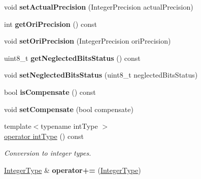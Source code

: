 \begin{DoxyCompactItemize}
void {\bfseries set\+Actual\+Precision} (Integer\+Precision actual\+Precision)
\item 
\hypertarget{classfap_1_1IntegerType_a84cae1be58ac753fe7b3ec7ab1057787}{}\label{classfap_1_1IntegerType_a84cae1be58ac753fe7b3ec7ab1057787} 
int {\bfseries get\+Ori\+Precision} () const
\item 
\hypertarget{classfap_1_1IntegerType_af24e56344bd02988028519d49bc3988a}{}\label{classfap_1_1IntegerType_af24e56344bd02988028519d49bc3988a} 
void {\bfseries set\+Ori\+Precision} (Integer\+Precision ori\+Precision)
\item 
\hypertarget{classfap_1_1IntegerType_ac63aa7c1e115d7a95299f5ff2ca07fda}{}\label{classfap_1_1IntegerType_ac63aa7c1e115d7a95299f5ff2ca07fda} 
uint8\+\_\+t {\bfseries get\+Neglected\+Bits\+Status} () const
\item 
\hypertarget{classfap_1_1IntegerType_a5754ff7a541bc36f8ca38244d701b3a0}{}\label{classfap_1_1IntegerType_a5754ff7a541bc36f8ca38244d701b3a0} 
void {\bfseries set\+Neglected\+Bits\+Status} (uint8\+\_\+t neglected\+Bits\+Status)
\item 
\hypertarget{classfap_1_1IntegerType_a55a1e4f164760d48eb8ec2aad94952b3}{}\label{classfap_1_1IntegerType_a55a1e4f164760d48eb8ec2aad94952b3} 
bool {\bfseries is\+Compensate} () const
\item 
\hypertarget{classfap_1_1IntegerType_aeffb9ae55abaeb1c94c2c1b4351ddb5a}{}\label{classfap_1_1IntegerType_aeffb9ae55abaeb1c94c2c1b4351ddb5a} 
void {\bfseries set\+Compensate} (bool compensate)
\item 
\hypertarget{classfap_1_1IntegerType_a892054b1decc10cf328dd45585c0fd3a}{}\label{classfap_1_1IntegerType_a892054b1decc10cf328dd45585c0fd3a} 
{\footnotesize template$<$typename int\+Type $>$ }\\\hyperlink{classfap_1_1IntegerType_a892054b1decc10cf328dd45585c0fd3a}{operator int\+Type} () const
\begin{DoxyCompactList}\small\item\em Conversion to integer types. \end{DoxyCompactList}\item 
\hypertarget{classfap_1_1IntegerType_ae499b68158996f18fb2846074f26e1c9}{}\label{classfap_1_1IntegerType_ae499b68158996f18fb2846074f26e1c9} 
\hyperlink{classfap_1_1IntegerType}{Integer\+Type} \& {\bfseries operator+=} (\hyperlink{classfap_1_1IntegerType}{Integer\+Type})
\item 
\hypertarget{classfap_1_1IntegerType_af143333990ebe27a5d3db8f9adf7efa2}{}\label{classfap_1_1IntegerType_af143333990ebe27a5d3db8f9adf7efa2} 

\end{DoxyCompactItemize}
